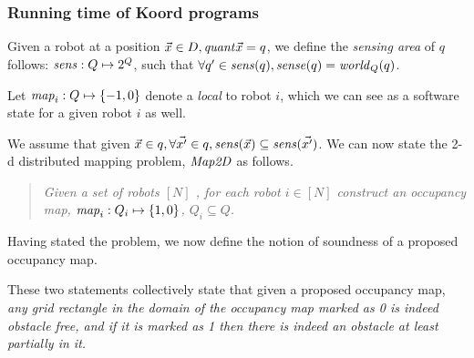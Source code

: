 \subsubsection{Running time of Koord programs}


\begin{definition}
   Given a robot at a position $\Vec{x}\in D, \mathit{quant}{\Vec{x}} = q$, we define the \emph{sensing area} of $q$ follows: $\mathit{sens}: Q \mapsto 2^{Q}$, such that  $\forall q^\prime \in \mathit{sens}(q), \mathit{sense}(q) = \mathit{world}_Q(q)$.  
\end{definition}




Let $\mathit{map}_i:Q\mapsto \left\{-1,0\right\}$ denote a \qdfunc \emph{local} to robot $i$, which we can see as a software state for a given robot $i$ as well.  %



We assume that given $\Vec{x} \in q, \forall \Vec{x^\prime} \in q, \mathit{sens}(\Vec{x}) \subseteq \mathit{sens}(\Vec{x^\prime})$. We can now state the 2-d distributed mapping problem, $\mathit{Map2D}$ as follows. \begin{quote}
{\em Given a set of robots $[N]$ , for each robot $i \in [N]$ construct an \emph{occupancy map}, $\mathit{map}_i: Q_i \mapsto \left\{1,0\right\}$, $Q_i\subseteq Q$.
}
\end{quote}


Having stated the problem, we now define the notion of soundness of a proposed occupancy map.
\begin{definition}
    \label{soundness}
   
\end{definition}


These two statements collectively state that given a proposed occupancy map, \emph{any grid rectangle in the domain of the occupancy map marked as 0 is indeed obstacle free, and if it is marked as 1 then there is indeed an obstacle at least partially in it.}

